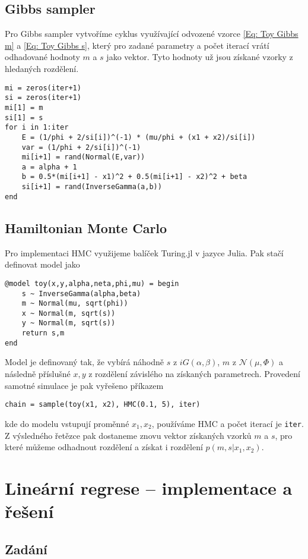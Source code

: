 \documentclass[11pt,oneside,american,czech]{article}
\begin{document}
\subsection{Gibbs sampler}

Pro Gibbs sampler vytvoříme cyklus využívající odvozené vzorce \eqref{Eq: Toy Gibbs m} a \eqref{Eq: Toy Gibbs s}, který pro zadané parametry a počet iterací vrátí odhadované hodnoty $m$ a $s$ jako vektor. Tyto hodnoty už jsou získané vzorky z hledaných rozdělení.

\begin{lstlisting}
mi = zeros(iter+1)
si = zeros(iter+1)
mi[1] = m
si[1] = s
for i in 1:iter
	E = (1/phi + 2/si[i])^(-1) * (mu/phi + (x1 + x2)/si[i])
	var = (1/phi + 2/si[i])^(-1)
	mi[i+1] = rand(Normal(E,var))
	a = alpha + 1
	b = 0.5*(mi[i+1] - x1)^2 + 0.5(mi[i+1] - x2)^2 + beta
	si[i+1] = rand(InverseGamma(a,b))
end
\end{lstlisting}

\subsection{Hamiltonian Monte Carlo}

Pro implementaci HMC využijeme balíček Turing.jl v jazyce Julia. Pak stačí definovat model jako
\begin{lstlisting}[]
@model toy(x,y,alpha,neta,phi,mu) = begin
	s ~ InverseGamma(alpha,beta)
	m ~ Normal(mu, sqrt(phi))
	x ~ Normal(m, sqrt(s))
	y ~ Normal(m, sqrt(s))
	return s,m
end
\end{lstlisting}
Model je definovaný tak, že vybírá náhodně $s$ z $iG(\alpha,\beta)$, $m$ z $\mathcal{N}(\mu,\Phi)$ a následně příslušné $x, y$ z rozdělení závislého na získaných parametrech. Provedení samotné simulace je pak vyřešeno příkazem
\begin{lstlisting}
chain = sample(toy(x1, x2), HMC(0.1, 5), iter)
\end{lstlisting}
kde do modelu vstupují proměnné $x_1, x_2$, používáme HMC a počet iterací je \verb|iter|. Z výsledného řetězce pak dostaneme znovu vektor získaných vzorků $m$ a $s$, pro které můžeme odhadnout rozdělení a získat i rozdělení $p(m,s|x_1,x_2)$.

\section{Lineární regrese -- implementace a řešení}
\subsection{Zadání}
\end{document}
